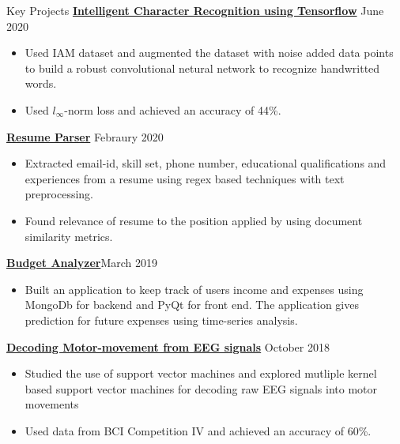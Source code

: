 \documentclass{resume} %
\begin{document}
\begin{rSection}{Key Projects}
\vspace*{0.1in}
{ \bf \href{https://github.com/arunpalaniappan/Handwriting-Recognition-using-Tensorflow}{Intelligent Character Recognition using Tensorflow}} {\hfill June 2020}
\begin{itemize}
\item Used IAM dataset and augmented the dataset with noise added data points to build a robust convolutional netural network to recognize handwritted words.
\item Used $l_{\infty}$-norm loss and achieved an accuracy of 44\%.
\end{itemize}

{\bf \href{https://github.com/arunpalaniappan/resume-parser}{Resume Parser}} {\hfill Febraury 2020}
\begin{itemize}
\item Extracted email-id, skill set, phone number, educational qualifications and experiences from a resume using regex based techniques with text preprocessing.
\item Found relevance of resume to the position applied by using document similarity metrics.
\end{itemize}

{\bf \href{https://github.com/arunpalaniappan/budget-analyzer}{Budget Analyzer}}{\hfill March 2019}
\begin{itemize}
\item Built an application to keep track of users income and expenses using MongoDb for backend and PyQt for front end.  The application gives prediction for future expenses using time-series analysis.
\end{itemize}

{\bf \href{https://github.com/arunpalaniappan/Decoding-raw-EEG-signals}{Decoding Motor-movement from EEG signals}} {\hfill October 2018}
\begin{itemize}
\item Studied the use of support vector machines and explored mutliple kernel based support vector machines for decoding raw EEG signals into motor movements
\item Used data from BCI Competition IV and achieved an accuracy of 60\%.
\end{itemize}

\end{rSection}

\pagebreak
\end{document}
